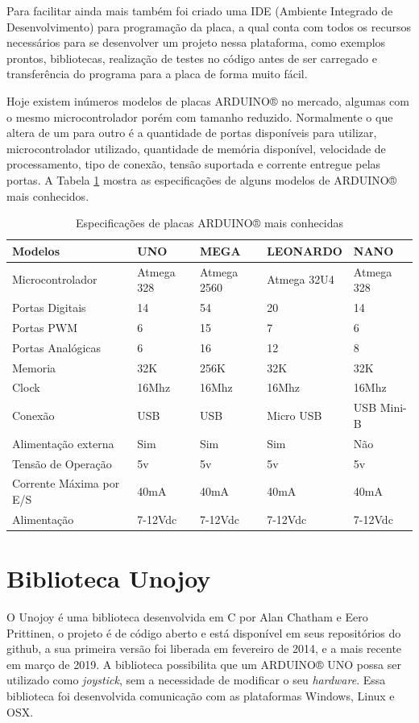 \documentclass[
	12pt,			%
	openright,		%
	oneside,			%
	a4paper,			%
	chapter=TITLE,		%
	english,			%
	brazil,			%
	]{abntex2}
\begin{document}
Para facilitar ainda mais também foi criado uma IDE (Ambiente Integrado de Desenvolvimento) para programação da placa, a qual conta com todos os recursos necessários para se desenvolver um projeto nessa plataforma, como exemplos prontos, bibliotecas, realização de testes no código antes de ser carregado e transferência do programa para a placa de forma muito fácil.

Hoje existem inúmeros modelos de placas ARDUINO® no mercado, algumas com o mesmo microcontrolador porém com tamanho reduzido. Normalmente o que altera de um para outro é a quantidade de portas disponíveis para utilizar, microcontrolador utilizado, quantidade de memória disponível, velocidade de processamento, tipo de conexão, tensão suportada e corrente entregue pelas portas. A Tabela \ref{tab:tab-2} mostra as especificações de alguns modelos de ARDUINO® mais conhecidos.

\begin{table}[H]
\caption{Especificações de placas ARDUINO® mais conhecidas}
\label{tab:tab-2}
{
\centering
\footnotesize
\begin{tabular}{|p{5cm}|p{2cm}|p{2cm}|p{3cm}|p{2cm}|}
\hline
\textbf{Modelos} & UNO & MEGA & LEONARDO & NANO \\
\hline
Microcontrolador & Atmega 328 & Atmega 2560 & Atmega 32U4 & Atmega 328 \\
\hline
Portas Digitais & 14 & 54 & 20 & 14 \\
\hline
Portas PWM & 6 & 15 & 7 & 6 \\
\hline
Portas Analógicas & 6 & 16 & 12 & 8 \\
\hline
Memoria & 32K & 256K & 32K & 32K \\
\hline
Clock & 16Mhz & 16Mhz & 16Mhz & 16Mhz \\
\hline
Conexão & USB & USB & Micro USB & USB Mini-B \\
\hline
Alimentação externa & Sim & Sim & Sim & Não \\
\hline
Tensão de Operação & 5v & 5v & 5v & 5v \\
\hline
Corrente Máxima por E/S & 40mA & 40mA & 40mA & 40mA \\
\hline
Alimentação & 7-12Vdc & 7-12Vdc & 7-12Vdc & 7-12Vdc\\
\hline
\end{tabular}
}
\end{table}

\section{Biblioteca Unojoy}
O Unojoy é uma biblioteca desenvolvida em C por Alan Chatham e Eero Prittinen, o projeto é de código aberto e está disponível em seus repositórios do github, a sua primeira versão foi liberada em fevereiro de 2014, e a mais recente em março de 2019. A biblioteca possibilita que um ARDUINO® UNO possa ser utilizado como \emph{joystick}, sem a necessidade de modificar o seu \emph{hardware}. Essa biblioteca foi desenvolvida comunicação com as plataformas Windows, Linux e OSX.
\end{document}
